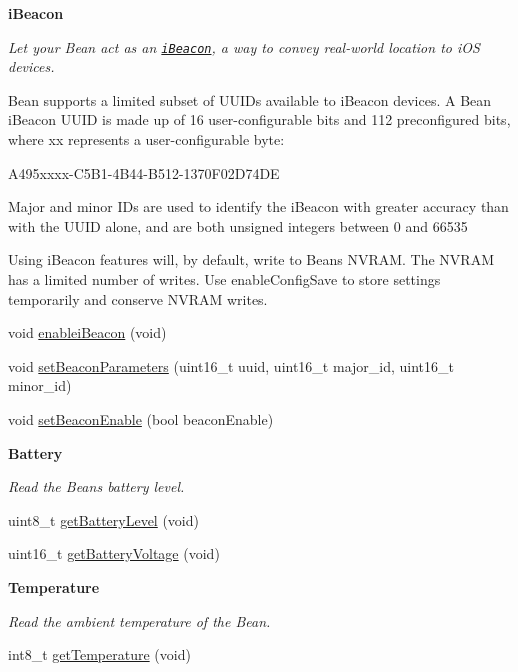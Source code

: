 \begin{Indent}{\bf i\+Beacon}\par
{\em Let your Bean act as an \href{https://developer.apple.com/ibeacon/}{\tt i\+Beacon}, a way to convey real-\/world location to i\+O\+S devices.

Bean supports a limited subset of U\+U\+I\+Ds available to i\+Beacon devices. A Bean i\+Beacon U\+U\+I\+D is made up of 16 user-\/configurable bits and 112 preconfigured bits, where {\ttfamily xx} represents a user-\/configurable byte\+:

{\ttfamily A495xxxx-\/\+C5\+B1-\/4\+B44-\/\+B512-\/1370\+F02\+D74\+D\+E}

Major and minor I\+Ds are used to identify the i\+Beacon with greater accuracy than with the U\+U\+I\+D alone, and are both unsigned integers between 0 and 66535

Using i\+Beacon features will, by default, write to Bean\textquotesingle{}s N\+V\+R\+A\+M. The N\+V\+R\+A\+M has a limited number of writes. Use {\ttfamily enable\+Config\+Save} to store settings temporarily and conserve N\+V\+R\+A\+M writes. }\begin{DoxyCompactItemize}
\item 
void \hyperlink{class_bean_class_a31d4e4fa7d66ddf1988e456ecbf9dc58}{enablei\+Beacon} (void)
\item 
void \hyperlink{class_bean_class_a3b78a7b755cda9f066104f339638d69c}{set\+Beacon\+Parameters} (uint16\+\_\+t uuid, uint16\+\_\+t major\+\_\+id, uint16\+\_\+t minor\+\_\+id)
\item 
void \hyperlink{class_bean_class_a354e2ff36d0e101b35255bae0a5e33ca}{set\+Beacon\+Enable} (bool beacon\+Enable)
\end{DoxyCompactItemize}
\end{Indent}
\begin{Indent}{\bf Battery}\par
{\em Read the Bean\textquotesingle{}s battery level. }\begin{DoxyCompactItemize}
\item 
uint8\+\_\+t \hyperlink{class_bean_class_ac21fd79279f5e25c37609ff15e53cea1}{get\+Battery\+Level} (void)
\item 
uint16\+\_\+t \hyperlink{class_bean_class_a862784d57eca8dd368172612e5e792de}{get\+Battery\+Voltage} (void)
\end{DoxyCompactItemize}
\end{Indent}
\begin{Indent}{\bf Temperature}\par
{\em Read the ambient temperature of the Bean. }\begin{DoxyCompactItemize}
\item 
int8\+\_\+t \hyperlink{class_bean_class_a711e837c145b51a8e95aa22a3fc9bcf9}{get\+Temperature} (void)
\end{DoxyCompactItemize}
\end{Indent}

